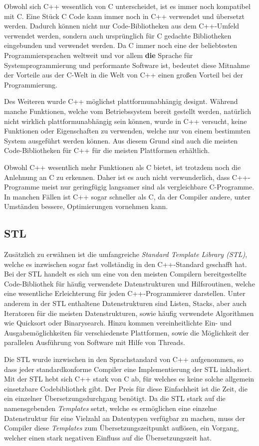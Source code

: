 Obwohl sich C++ wesentlich von C unterscheidet, ist es immer noch kompatibel mit C. Eine Stück C Code kann immer noch in C++ verwendet und
übersetzt werden. Dadurch können nicht nur Code-Bibliotheken aus dem C++-Umfeld verwendet werden, sondern auch ursprünglich für C gedachte
Bibliotheken eingebunden und verwendet werden. Da C immer noch eine der beliebtesten Programmiersprachen weltweit und vor allem \textbf{die}
Sprache für Systemprogrammierung und performante Software ist, bedeutet diese Mitnahme der Vorteile aus der C-Welt in die Welt von C++
einen großen Vorteil bei der Programmierung.

Des Weiteren wurde C++ möglichst plattformunabhängig designt. Während manche Funktionen, welche vom Betriebssystem bereit gestellt werden, 
natürlich nicht wirklich plat\-tform\-un\-ab\-hän\-gig sein können, wurde in C++ versucht, keine Funktionen oder Eigenschaften zu verwenden, welche
nur von einem bestimmten System ausgeführt werden können. Aus diesem Grund sind auch die meisten Code-Bibliotheken für C++ für die meisten
Plattformen erhältlich. 

Obwohl C++ wesentlich mehr Funktionen als C bietet, ist trotzdem noch die Anlehnung an C zu erkennen. Daher ist es auch nicht verwunderlich, dass C++-Programme meist nur geringfügig langsamer sind als 
vergleichbare C-Programme. In manchen Fällen ist C++ sogar schneller als C, da der Compiler andere, unter Umständen bessere, Optimierungen vornehmen kann. 

\subsection{STL}
\label{sec:stl}
Zusätzlich zu erwähnen ist die umfangreiche \textit{Standard Template Library (STL)}, welche es inzwischen sogar fast vollständig in den 
C++-Standard geschafft hat. Bei der STL handelt es sich um eine von den meisten Compilern bereitgestellte Code-Bibliothek für häufig 
verwendete Datenstrukturen und Hilfsroutinen, welche eine wesentliche Erleichterung für jeden C++-Programmierer darstellen. Unter anderem
in der STL enthaltene Datenstrukturen sind Listen, Stacks, aber auch Iteratoren für die meisten Datenstrukturen, sowie häufig verwendete Algorithmen
wie Quicksort oder Binarysearch. Hinzu kommen vereinheitlichte Ein- und Ausgabemöglichkeiten für verschiedenste Plattformen, sowie die 
Möglichkeit der parallelen Ausführung von Software mit Hilfe von Threads.

Die STL wurde inzwischen in den Sprachstandard von C++ aufgenommen, so dass jeder standardkonforme Compiler eine Implementierung der STL inkludiert. Mit der STL hebt sich C++ stark von C ab, für welches es keine solche allgemein einsetzbare Codebibliothek gibt. Der Preis für diese Einfachheit ist die Zeit, die ein einzelner Übersetzungsdurchgang benötigt. Da die STL stark auf die namensgebenden
\textit{Templates} setzt, welche es ermöglichen eine einzelne Datenstruktur für eine Vielzahl an Datentypen verfügbar zu machen, muss der Compiler diese \textit{Templates} zum Übersetzungszeitpunkt
auflösen, ein Vorgang, welcher einen stark negativen Einfluss auf die Übersetzungszeit hat.

